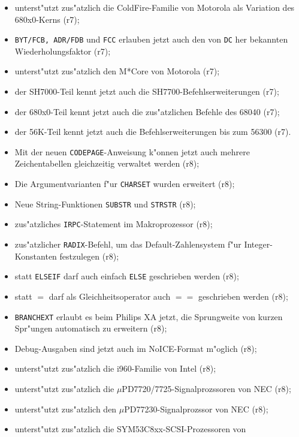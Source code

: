 \documentclass[12pt,a4paper,twoside]{report}
\newcommand{\tty}[1]{{\tt #1}}
\begin{document}
\begin{itemize}
{\begin{itemize}
{            Startadresse voranstellen (r7);}
      \item{unterst"utzt zus"atzlich die ColdFire-Familie von Motorola als
            Variation des 680x0-Kerns (r7);}
      \item{\tty{BYT/FCB, ADR/FDB} und \tty{FCC} erlauben jetzt auch den
            von \tty{DC} her bekannten Wiederholungsfaktor (r7);}
      \item{unterst"utzt zus"atzlich den M*Core von Motorola (r7);}
      \item{der SH7000-Teil kennt jetzt auch die SH7700-Befehlserweiterungen
            (r7);}
      \item{der 680x0-Teil kennt jetzt auch die zus"atzlichen Befehle des
            68040 (r7);}
      \item{der 56K-Teil kennt jetzt auch die Befehlserweiterungen bis zum
            56300 (r7).}
      \item{Mit der neuen \tty{CODEPAGE}-Anweisung k"onnen jetzt auch
            mehrere Zeichentabellen gleichzeitig verwaltet werden (r8);}
      \item{Die Argumentvarianten f"ur \tty{CHARSET} wurden erweitert
            (r8);}
      \item{Neue String-Funktionen \tty{SUBSTR} und \tty{STRSTR} (r8);}
      \item{zus"atzliches \tty{IRPC}-Statement im Makroprozessor (r8);}
      \item{zus"atzlicher {\tt RADIX}-Befehl, um das Default-Zahlensystem
            f"ur Integer-Konstanten festzulegen (r8);}
      \item{statt {\tt ELSEIF} darf auch einfach {\tt ELSE} geschrieben
            werden (r8);}
      \item{statt $=$ darf als Gleichheitsoperator auch $==$ geschrieben
            werden (r8);}
      \item{\tty{BRANCHEXT} erlaubt es beim Philips XA jetzt, die
            Sprungweite von kurzen Spr"ungen automatisch zu erweitern
            (r8);}
      \item{Debug-Ausgaben sind jetzt auch im NoICE-Format m"oglich (r8);}
      \item{unterst"utzt zus"atzlich die i960-Familie von Intel (r8);}
      \item{unterst"utzt zus"atzlich die $\mu$PD7720/7725-Signalprozssoren
            von NEC (r8);}
      \item{unterst"utzt zus"atzlich den $\mu$PD77230-Signalprozssor von
            NEC (r8);}
      \item{unterst"utzt zus"atzlich die SYM53C8xx-SCSI-Prozessoren von
}
\end{itemize}}
\end{itemize}
\end{document}
